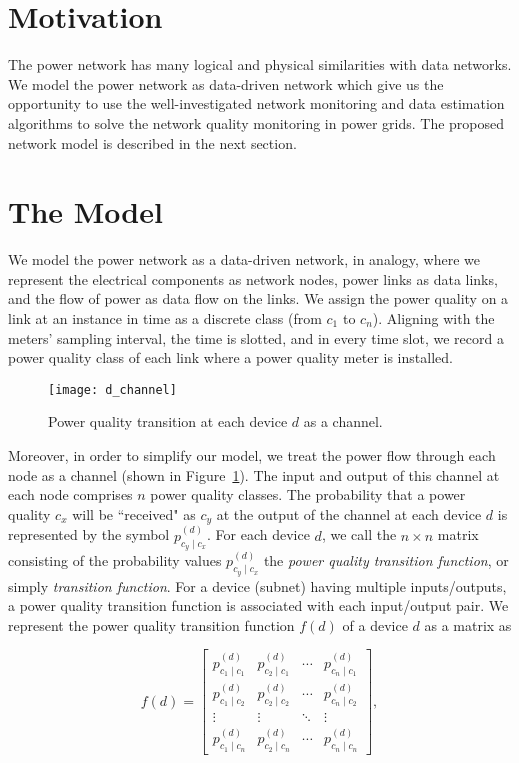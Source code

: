 \label{chap:networkModel}
\section{Motivation}
The power network has many logical and physical similarities with data networks. We model the power network as data-driven network which give us the opportunity to use the well-investigated network monitoring and data estimation algorithms to solve the network quality monitoring in power grids. The proposed network model is described in the next section.

\section{The Model}
We model the power network as a data-driven network, in analogy, where we represent the electrical components as network nodes, power links as data links, and the flow of power as data flow on the links. We assign the power quality on a link at an instance in time as a discrete class (from $c_1$ to $c_n$). Aligning with the meters' sampling interval, the time is slotted, and in every time slot, we record a power quality class of each link where a power quality meter is installed. 

\begin{figure}[!p]
    \centering
    \texttt{[image: d\_channel]}
    \caption{Power quality transition at each device $d$ as a channel.}
    \label{fig:d_channel}
\end{figure}

Moreover, in order to simplify our model, we treat the power flow through each node as a channel (shown in Figure~\ref{fig:d_channel}). The input and output of this channel at each node comprises $n$ power quality classes. The probability that a power quality $c_x$ will be ``received" as $c_y$ at the output of the channel at each device $d$ is represented by the symbol $p_{c_y  \mid c_x}^{(d)}$. For each device $d$, we call the $n\times n$ matrix consisting of the probability values  $p_{c_y  \mid c_x}^{(d)}$ the \emph{power quality transition function}, or simply \emph{transition function}. For a device (subnet) having multiple inputs/outputs, a power quality transition function is associated with each input/output pair. We represent the power quality transition function $f(d)$ of a device $d$ as a matrix as

\begin{equation}
f(d) = \left[\begin{array}{cccc} p_{c_1 \mid c_1}^{(d)} & p_{c_2 \mid c_1}^{(d)} & \cdots & p_{c_n \mid c_1}^{(d)}\\
p_{c_1 \mid c_2}^{(d)} & p_{c_2 \mid c_2}^{(d)} & \cdots & p_{c_n \mid c_2}^{(d)}\\
\vdots & \vdots& \ddots & \vdots\\
p_{c_1 \mid c_n}^{(d)} & p_{c_2 \mid c_n}^{(d)} & \cdots & p_{c_n \mid c_n}^{(d)}
\end{array}\right],
\label{eqn:pqf}
\end{equation}

